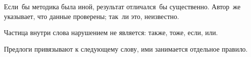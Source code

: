 Если~бы методика была иной, результат отличался~бы существенно.
Автор~же указывает, что данные проверены; так~ли это, неизвестно.

Частица внутри слова нарушением не является: также, тоже, если, или.

Предлоги привязывают к следующему слову, ими занимается отдельное правило.

